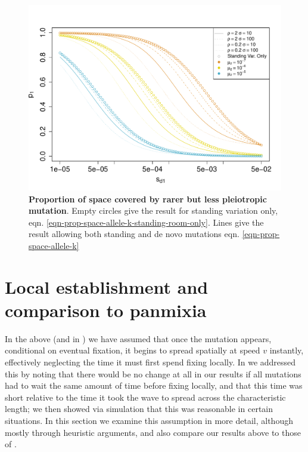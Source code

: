 \documentclass{article}
\begin{document}
\begin{figure}[ht]
\begin{center}
  \includegraphics[width=1.0\textwidth]{pleiotropy_calc}
\caption{ %
{\bf Proportion of space covered by rarer but less pleiotropic
  mutation}. Empty circles give the result for standing variation only,
  eqn. \eqref{eqn-prop-space-allele-k-standing-room-only}. Lines give
  the result allowing both standing and de novo mutations  eqn. \eqref{eqn-prop-space-allele-k}}   \label{fig-pleiotropy_calc}
\end{center}
\end{figure}


\section{Local establishment and comparison to panmixia}

In the above (and in \citet{ralphcoop2010}) we have assumed that once the mutation appears,
conditional on eventual fixation, it begins to spread spatially at speed $v$ instantly,
effectively neglecting the time it must first spend fixing locally.
In \citet{ralphcoop2010} we addressed this by noting that there would be no change at all in our results 
if all mutations had to wait the same amount of time before fixing locally,
and that this time was short relative to the time it took the wave to spread across the characteristic length;
we then showed via simulation that this was reasonable in certain situations.
In this section we examine this assumption in more detail, although mostly through heuristic arguments,
and also compare our results above to those of \citet{softsweeps}.
\end{document}
